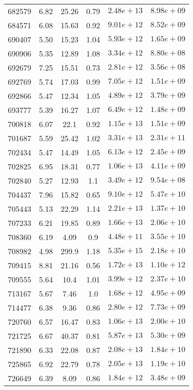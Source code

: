 \begin{table}
\begin{tabular}{cccccc}
682579 & 6.82 & 25.26 & 0.79 & $2.48e+13$ & $8.98e+09$ \\
684571 & 6.08 & 15.63 & 0.92 & $9.01e+12$ & $8.52e+09$ \\
690407 & 5.50 & 15.23 & 1.04 & $5.93e+12$ & $1.65e+09$ \\
690906 & 5.35 & 12.89 & 1.08 & $3.34e+12$ & $8.80e+08$ \\
692679 & 7.25 & 15.51 & 0.73 & $2.81e+12$ & $3.56e+08$ \\
692769 & 5.74 & 17.03 & 0.99 & $7.05e+12$ & $1.51e+09$ \\
692866 & 5.47 & 12.34 & 1.05 & $4.89e+12$ & $3.79e+09$ \\
693777 & 5.39 & 16.27 & 1.07 & $6.49e+12$ & $1.48e+09$ \\
700818 & 6.07 & 22.1 & 0.92 & $1.15e+13$ & $1.51e+09$ \\
701687 & 5.59 & 25.42 & 1.02 & $3.31e+13$ & $2.31e+11$ \\
702434 & 5.47 & 14.49 & 1.05 & $6.13e+12$ & $2.45e+09$ \\
702825 & 6.95 & 18.31 & 0.77 & $1.06e+13$ & $4.11e+09$ \\
702840 & 5.27 & 12.93 & 1.1 & $3.49e+12$ & $9.54e+08$ \\
704437 & 7.96 & 15.82 & 0.65 & $9.10e+12$ & $5.47e+10$ \\
705443 & 5.13 & 22.29 & 1.14 & $2.21e+13$ & $1.37e+10$ \\
707233 & 6.21 & 19.85 & 0.89 & $1.66e+13$ & $2.06e+10$ \\
708360 & 6.19 & 4.09 & 0.9 & $4.48e+11$ & $3.55e+10$ \\
708982 & 4.98 & 299.9 & 1.18 & $5.35e+15$ & $2.18e+10$ \\
709415 & 8.81 & 21.16 & 0.56 & $1.72e+13$ & $1.10e+12$ \\
709555 & 5.64 & 10.4 & 1.01 & $3.99e+12$ & $2.37e+10$ \\
713167 & 5.67 & 7.46 & 1.0 & $1.68e+12$ & $4.95e+09$ \\
714477 & 6.38 & 9.36 & 0.86 & $2.80e+12$ & $7.73e+09$ \\
720760 & 6.57 & 16.47 & 0.83 & $1.06e+13$ & $2.00e+10$ \\
721725 & 6.67 & 40.37 & 0.81 & $5.87e+13$ & $5.30e+09$ \\
721890 & 6.33 & 22.08 & 0.87 & $2.08e+13$ & $1.84e+10$ \\
725865 & 6.92 & 22.79 & 0.78 & $2.05e+13$ & $1.19e+10$ \\
726649 & 6.39 & 8.09 & 0.86 & $1.84e+12$ & $3.48e+09$ \\

\end{tabular}
\end{table}
